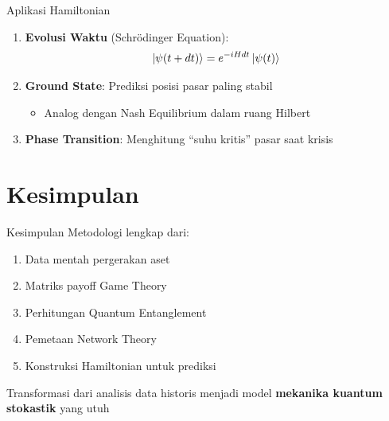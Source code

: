 \documentclass[aspectratio=169]{beamer}
\begin{document}
\begin{frame}{Aplikasi Hamiltonian}
    \begin{enumerate}
        \item \textbf{Evolusi Waktu} (Schrödinger Equation):
        \begin{equation}
            \ket{\psi(t+dt)} = e^{-iHdt} \ket{\psi(t)}
        \end{equation}
        
        \item \textbf{Ground State}: Prediksi posisi pasar paling stabil
            \begin{itemize}
                \item Analog dengan Nash Equilibrium dalam ruang Hilbert
            \end{itemize}
        
        \item \textbf{Phase Transition}: Menghitung ``suhu kritis'' pasar saat krisis
    \end{enumerate}
\end{frame}

\section{Kesimpulan}

\begin{frame}{Kesimpulan}
    Metodologi lengkap dari:
    \begin{enumerate}
        \item Data mentah pergerakan aset
        \item Matriks payoff Game Theory
        \item Perhitungan Quantum Entanglement
        \item Pemetaan Network Theory
        \item Konstruksi Hamiltonian untuk prediksi
    \end{enumerate}
    
    \vspace{0.5cm}
    
    Transformasi dari analisis data historis menjadi model \textbf{mekanika kuantum stokastik} yang utuh
\end{frame}
\end{document}
